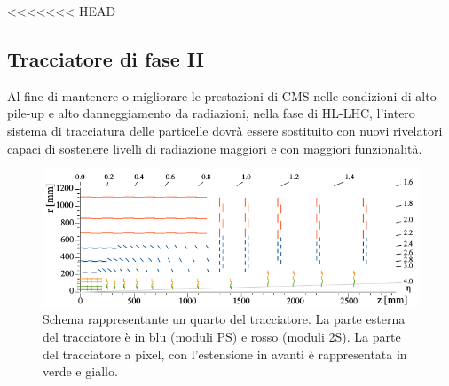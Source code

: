 <<<<<<< HEAD
\subsection{Tracciatore di fase II}

Al fine di mantenere o migliorare le prestazioni di CMS nelle condizioni di alto pile-up e alto danneggiamento da radiazioni, nella fase  di HL-LHC, l'intero sistema di tracciatura delle particelle dovrà essere sostituito con nuovi rivelatori capaci di sostenere livelli di radiazione maggiori e con maggiori funzionalità.
\begin{figure}
\centering
\includegraphics[scale=0.4]{Immagini/TrackerPhaseII}
\caption{Schema rappresentante un quarto del tracciatore. La parte esterna del tracciatore è in blu (moduli PS) e rosso (moduli 2S). La parte del tracciatore a pixel, con l'estensione in avanti è rappresentata in verde e giallo.}
\label{TrackerPhaseII}
\end{figure}

